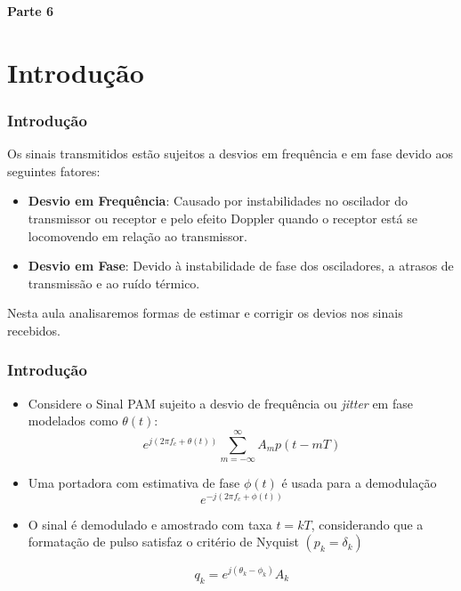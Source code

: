 
\begin{frame}
	\begin{block}{\centering\large\bfseries Parte 6}
		\centering\large\insertpart
	\end{block}
\end{frame}

\section{Introdução}
\begin{frame}
	\frametitle{Introdução}
	
	Os sinais transmitidos estão sujeitos a desvios em frequência e em fase devido aos seguintes fatores:
	
	\begin{itemize}
		\item \textbf{Desvio em Frequência}: Causado por instabilidades no oscilador do transmissor ou receptor e pelo efeito Doppler quando o receptor está se locomovendo em relação ao transmissor.
		
		\item \textbf{Desvio em Fase}: Devido à instabilidade de fase dos osciladores, a atrasos de transmissão e ao ruído térmico. 
	\end{itemize}
	
	Nesta aula analisaremos formas de estimar e corrigir os devios nos sinais recebidos. 
\end{frame}

\begin{frame}
	\frametitle{Introdução}
	\begin{itemize}		
	
		\item Considere o Sinal PAM sujeito a desvio de frequência ou \textit{jitter} em fase modelados como $\theta(t)$:
		\begin{equation*}
			e^{j(2\pi f_c + \theta(t))}\sum_{m=-\infty}^{\infty}A_m p(t-mT)
		\end{equation*}
		
		
		
		\item Uma portadora com estimativa de fase $\phi(t)$ é usada para a demodulação
		\begin{equation*}
			e^{-j(2\pi f_c + \phi(t))}
		\end{equation*}
		
		\item O sinal é demodulado e amostrado com taxa $t=kT$, considerando que a formatação de pulso satisfaz o critério de Nyquist $(p_k=\delta_k)$
		
		\begin{equation*}
			q_k=e^{j(\theta_k - \phi_k)}A_k
		\end{equation*}
	\end{itemize}
	
\end{frame}

